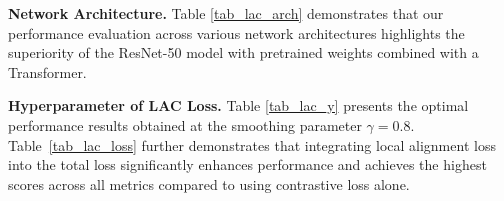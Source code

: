 \noindent \textbf{Network Architecture.} Table \ref{tab_lac_arch} demonstrates that our performance evaluation across various network architectures highlights the superiority of the ResNet-50 model with pretrained weights combined with a Transformer.

\noindent \textbf{Hyperparameter of LAC Loss.} Table \ref{tab_lac_y} presents the optimal performance results obtained at the smoothing parameter $\gamma = 0.8$. 
Table~\ref{tab_lac_loss} further demonstrates that integrating local alignment loss into the total loss significantly enhances performance and achieves the highest scores across all metrics compared to using contrastive loss alone.
